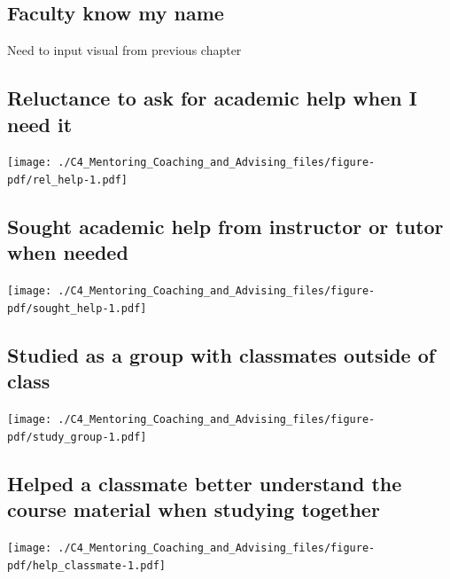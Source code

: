 \documentclass[
  letterpaper,
  DIV=11,
  numbers=noendperiod]{scrreprt}
\begin{document}
\hypertarget{faculty-know-my-name}{%
\subsection{Faculty know my name}\label{faculty-know-my-name}}

Need to input visual from previous chapter

\hypertarget{reluctance-to-ask-for-academic-help-when-i-need-it}{%
\subsection{Reluctance to ask for academic help when I need
it}\label{reluctance-to-ask-for-academic-help-when-i-need-it}}

\texttt{[image: ./C4\_Mentoring\_Coaching\_and\_Advising\_files/figure-pdf/rel\_help-1.pdf]}

\hypertarget{sought-academic-help-from-instructor-or-tutor-when-needed}{%
\subsection{Sought academic help from instructor or tutor when
needed}\label{sought-academic-help-from-instructor-or-tutor-when-needed}}

\texttt{[image: ./C4\_Mentoring\_Coaching\_and\_Advising\_files/figure-pdf/sought\_help-1.pdf]}

\hypertarget{studied-as-a-group-with-classmates-outside-of-class}{%
\subsection{Studied as a group with classmates outside of
class}\label{studied-as-a-group-with-classmates-outside-of-class}}

\texttt{[image: ./C4\_Mentoring\_Coaching\_and\_Advising\_files/figure-pdf/study\_group-1.pdf]}

\hypertarget{helped-a-classmate-better-understand-the-course-material-when-studying-together}{%
\subsection{Helped a classmate better understand the course material
when studying
together}\label{helped-a-classmate-better-understand-the-course-material-when-studying-together}}

\texttt{[image: ./C4\_Mentoring\_Coaching\_and\_Advising\_files/figure-pdf/help\_classmate-1.pdf]}
\end{document}
